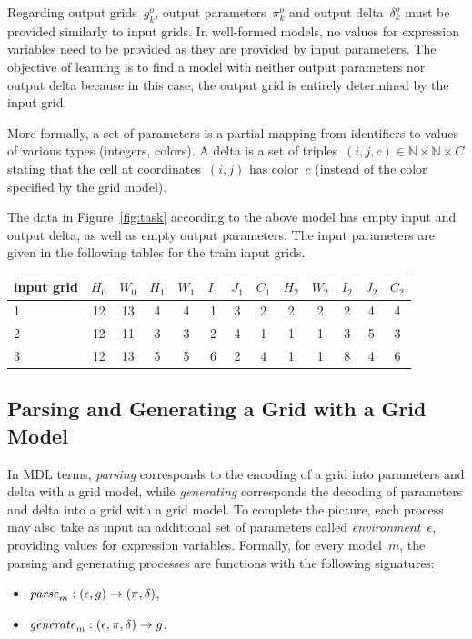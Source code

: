 \documentclass[a4paper]{llncs}
\newcommand{\nat}{\mathbb{N}}
\begin{document}
Regarding output grids~$g^o_k$, output parameters~$\pi^o_k$ and output
delta~$\delta^o_k$ must be provided similarly to input grids. In
well-formed models, no values for expression variables need to be
provided as they are provided by input parameters. The objective of
learning is to find a model with neither output parameters nor output
delta because in this case, the output grid is entirely determined by
the input grid.

More formally, a set of parameters is a partial mapping from
identifiers to values of various types (integers, colors). A delta is
a set of triples~$(i,j,c) \in \nat \times \nat \times C$ stating that
the cell at coordinates~$(i,j)$ has color~$c$ (instead of the color
specified by the grid model).

The data in Figure~\ref{fig:task} according to the above model has
empty input and output delta, as well as empty output parameters. The
input parameters are given in the following tables for the train input
grids.
\begin{center}
  \begin{tabular}{l|cccccccccccc}
    input grid & $H_0$ & $W_0$ & $H_1$ & $W_1$ & $I_1$ & $J_1$ & $C_1$ & $H_2$ & $W_2$ & $I_2$ & $J_2$ & $C_2$ \\
    \hline
    1 & 12 & 13 & 4 & 4 & 1 & 3 & 2 & 2 & 2 & 2 & 4 & 4 \\
    2 & 12 & 11 & 3 & 3 & 2 & 4 & 1 & 1 & 1 & 3 & 5 & 3 \\
    3 & 12 & 13 & 5 & 5 & 6 & 2 & 4 & 1 & 1 & 8 & 4 & 6 \\
    \hline
  \end{tabular}
\end{center}

\subsection{Parsing and Generating a Grid with a Grid Model}
\label{parsing}
\label{generating}


In MDL terms, {\em parsing} corresponds to the encoding of a grid into
parameters and delta with a grid model, while {\em generating}
corresponds the decoding of parameters and delta into a grid with a
grid model. To complete the picture, each process may also take as
input an additional set of parameters called {\em
  environment}~$\epsilon$, providing values for expression variables.
%
Formally, for every model~$m$, the parsing and generating processes
are functions with the following signatures:
\begin{itemize}
\item ${\it parse}_m : (\epsilon, g) \to (\pi, \delta)$,
\item ${\it generate}_m : (\epsilon, \pi, \delta) \to g$.
\end{itemize}
\end{document}
